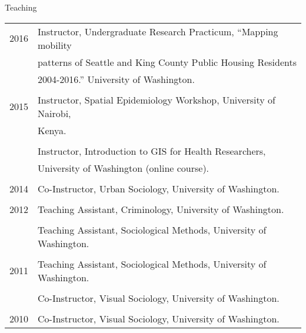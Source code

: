 \documentclass{resume} %
\begin{document}
\begin{rSection}{Teaching}
\vspace{5mm}
\begin{tabular}{ @{} >{}l @{\hspace{6ex}} l }
2016	& Instructor, Undergraduate Research Practicum, ``Mapping mobility\\
		& patterns of Seattle and King County Public Housing Residents\\
		& 2004-2016.'' University of Washington.\\\\

2015 	& Instructor, Spatial Epidemiology Workshop, University of Nairobi,\\
		& Kenya.\\\\

		& Instructor, Introduction to GIS for Health Researchers, \\
		& University of Washington (online course).\\\\

2014 	& Co-Instructor, Urban Sociology, University of Washington.\\\\

2012	& Teaching Assistant, Criminology, University of Washington.\\\\

	 	& Teaching Assistant, Sociological Methods, University of Washington.\\\\

2011 	& Teaching Assistant, Sociological Methods, University of Washington.\\\\

	 	& Co-Instructor, Visual Sociology, University of Washington.\\\\

2010 	& Co-Instructor, Visual Sociology, University of Washington.
\end{tabular}
\vspace{5mm}
\end{rSection}

%
%
\end{document}
